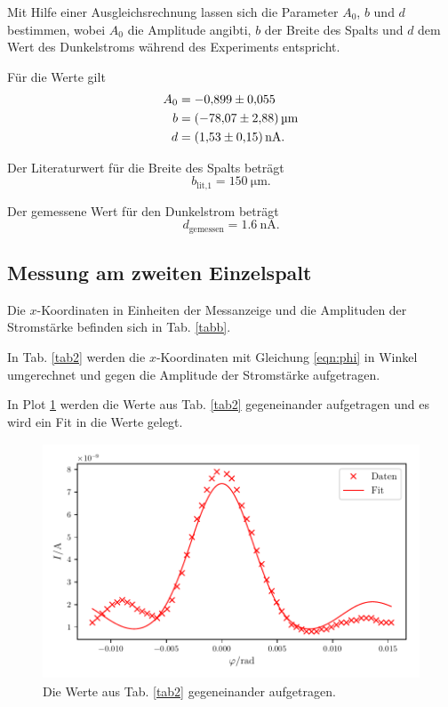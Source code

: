 \noindent Mit Hilfe einer Ausgleichsrechnung lassen sich die Parameter $A_0$, $b$ und $d$ bestimmen, wobei $A_0$ die Amplitude angibti, $b$ der Breite des Spalts  und $d$ dem Wert des Dunkelstroms während des Experiments entspricht. 

\noindent Für die Werte gilt
\begin{align*}
    A_0 &= \num{-0.899(055)} \\
    b &= \SI{-78.07 \pm 2.88}{\micro\meter} \\
    d &= \SI{1.53(15)}{\nano\ampere}.
\end{align*}

\noindent Der Literaturwert für die Breite des Spalts beträgt
\begin{equation*}
    b_{\text{lit,1}} = \SI{150}{\micro\meter}.
\end{equation*}

\noindent Der gemessene Wert für den Dunkelstrom beträgt 
\begin{equation*}
    d_\text{gemessen}= \SI{1.6}{\nano\ampere}.
\end{equation*}


\subsection{Messung am zweiten Einzelspalt}
Die $x$-Koordinaten in Einheiten der Messanzeige und die Amplituden der Stromstärke befinden sich in Tab. \ref{tabb}. 



\noindent In Tab. \ref{tab2} werden die $x$-Koordinaten mit Gleichung \eqref{eqn:phi} in Winkel umgerechnet und gegen die Amplitude der Stromstärke aufgetragen. 



\noindent In Plot \ref{fig:plot2} werden die Werte aus Tab. \ref{tab2} gegeneinander aufgetragen und es wird ein Fit in die Werte gelegt. 
\begin{figure}
    \centering
    \includegraphics[width=12cm, height=7cm]{build/plot2.pdf}
    \caption{Die Werte aus Tab. \ref{tab2} gegeneinander aufgetragen.}
    \label{fig:plot2}
\end{figure}

